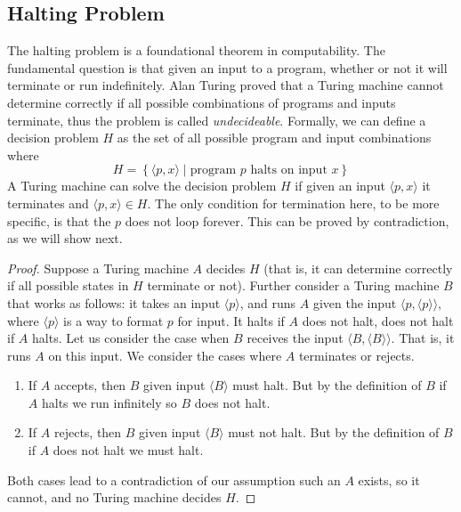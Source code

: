 \documentclass[conference]{IEEEtran}
\begin{document}
\subsection{Halting Problem}

The halting problem is a foundational theorem in computability\cite{brilliant}. The fundamental question is that given an input to a program, whether or not it will terminate or run indefinitely.
Alan Turing proved that a Turing machine cannot determine correctly if all possible combinations of programs and inputs terminate, thus the problem is called \textit{undecideable}. Formally, we can define a decision problem $H$ as the set of all possible program and input combinations where
\begin{equation*}
    H=\left\{\langle p,x \rangle\mid \text{program $p$ halts on input $x$}\right\}
\end{equation*}
A Turing machine can solve the decision problem $H$ if given an input $\langle p,x \rangle$ it terminates and $\langle p,x \rangle\in H$. The only condition for termination here, to be more specific, is that the $p$ does not loop forever. This can be proved by contradiction, as we will show next.

\begin{proof}
    Suppose a Turing machine $A$ decides $H$ (that is, it can determine correctly if all possible states in $H$ terminate or not). Further consider a Turing machine $B$ that works as follows: it takes an input $\langle p\rangle$, and runs $A$ given the input $\langle p,\langle p\rangle \rangle$, where $\langle p\rangle$ is a way to format $p$ for input. It halts if $A$ does not halt, does not halt if $A$ halts. Let us consider the case when $B$ receives the input $\langle B,\langle B\rangle \rangle$. That is, it runs $A$ on this input. We consider the cases where $A$ terminates or rejects.
    \begin{enumerate}
        \item If $A$ accepts, then $B$ given input $\langle B\rangle $ must halt. But by the definition of $B$ if $A$ halts we run infinitely so $B$ does not halt.
        \item If $A$ rejects, then $B$ given input $\langle B\rangle $ must not halt. But by the definition of $B$ if $A$ does not halt we must halt.
    \end{enumerate}
    Both cases lead to a contradiction of our assumption such an $A$ exists, so it cannot, and no Turing machine decides $H$.
\end{proof}
\end{document}
